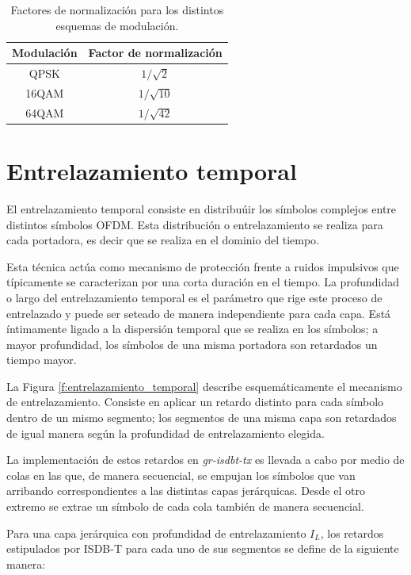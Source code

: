 \begin{table}[h!]
\centering
\begin{tabular}{|c|c|}
\hline
\textbf{Modulaci\'on} 				& \textbf{Factor de normalizaci\'on}\\
\hline
QPSK 		& $1/ \sqrt{2}$\\
\hline
16QAM		& $1/ \sqrt{10}$ \\
\hline
64QAM 		& $1/ \sqrt{42}$ \\
\hline
\end{tabular}
\caption{\label{t:factor_normalizacion} Factores de normalizaci\'on para los distintos esquemas de modulaci\'on.}
\end{table}


\section{Entrelazamiento temporal}

El entrelazamiento temporal consiste en distribu\'uir los s\'imbolos complejos entre distintos s\'imbolos OFDM. Esta distribuci\'on o entrelazamiento se realiza para cada portadora, es decir que se realiza en el dominio del tiempo.

Esta t\'ecnica act\'ua como mecanismo de protecci\'on frente a ruidos impulsivos que t\'ipicamente se caracterizan por una corta duraci\'on en el tiempo. La profundidad o largo del entrelazamiento temporal es el par\'ametro que rige este proceso de entrelazado y puede ser seteado de manera independiente para cada capa. Est\'a \'intimamente ligado a la dispersi\'on temporal que se realiza en los s\'imbolos; a mayor profundidad, los s\'imbolos de una misma portadora son retardados un tiempo mayor.

La Figura \ref{f:entrelazamiento_temporal} describe esquem\'aticamente el mecanismo de entrelazamiento. Consiste en aplicar un retardo distinto para cada s\'imbolo dentro de un mismo segmento; los segmentos de una misma capa son retardados de igual manera seg\'un la profundidad de entrelazamiento elegida. 

La implementaci\'on de estos retardos en \textit{gr-isdbt-tx} es llevada a cabo por medio de colas en las que, de manera secuencial, se empujan los s\'imbolos que van arribando correspondientes a las distintas capas jer\'arquicas. Desde el otro extremo se extrae un s\'imbolo de cada cola tambi\'en de manera secuencial. 

Para una capa jer\'arquica con profundidad de entrelazamiento $I_L$, los retardos estipulados por ISDB-T para cada uno de sus segmentos se define de la siguiente manera:

